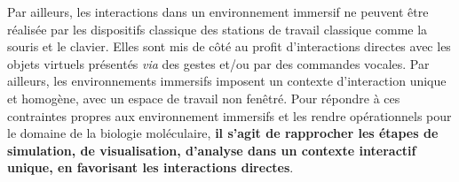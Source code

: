 Par ailleurs, les interactions dans un environnement immersif ne peuvent être réalisée par les dispositifs classique des stations de travail classique comme la souris et le clavier.
Elles sont mis de côté au profit d'interactions directes avec les objets virtuels présentés \textit{via} des gestes et/ou par des commandes vocales. Par ailleurs, les environnements immersifs imposent un contexte d'interaction unique et homogène, avec un espace de travail non fenêtré. Pour répondre à ces contraintes propres aux environnement immersifs et les rendre opérationnels pour le domaine de la biologie moléculaire, \textbf{il s'agit de rapprocher les étapes de simulation, de visualisation, d'analyse dans un contexte interactif unique, en favorisant les interactions directes}.






